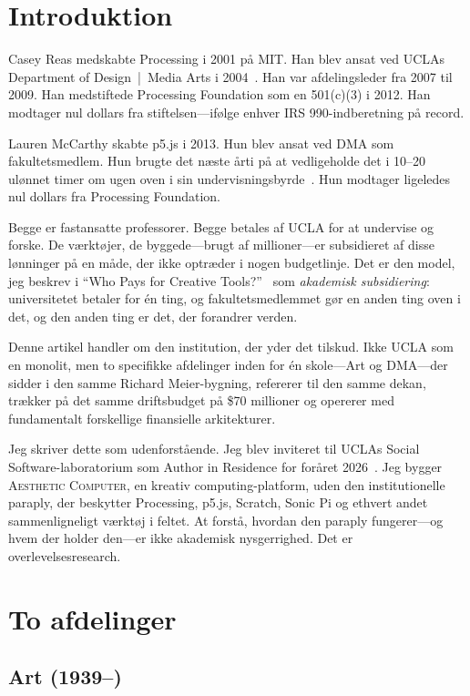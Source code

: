 \documentclass[10pt,letterpaper,twocolumn]{article}
\newcommand{\ac}{\textsc{Aesthetic Computer}}
\newcommand{\dma}{\textsc{DMA}}
\begin{document}
\section{Introduktion}

Casey Reas medskabte Processing i 2001 på MIT. Han blev ansat ved UCLAs Department of Design~|~Media Arts i 2004~\citep{dmahistory}. Han var afdelingsleder fra 2007 til 2009. Han medstiftede Processing Foundation som en 501(c)(3) i 2012. Han modtager nul dollars fra stiftelsen---ifølge enhver IRS 990-indberetning på record.

Lauren McCarthy skabte p5.js i 2013. Hun blev ansat ved \dma{} som fakultetsmedlem. Hun brugte det næste årti på at vedligeholde det i 10--20 ulønnet timer om ugen oven i sin undervisningsbyrde~\citep{mccarthy2023making}. Hun modtager ligeledes nul dollars fra Processing Foundation.

Begge er fastansatte professorer. Begge betales af UCLA for at undervise og forske. De værktøjer, de byggede---brugt af millioner---er subsidieret af disse lønninger på en måde, der ikke optræder i nogen budgetlinje. Det er den model, jeg beskrev i ``Who Pays for Creative Tools?''~\citep{scudder2026sustainability} som \emph{akademisk subsidiering}: universitetet betaler for én ting, og fakultetsmedlemmet gør en anden ting oven i det, og den anden ting er det, der forandrer verden.

Denne artikel handler om den institution, der yder det tilskud. Ikke UCLA som en monolit, men to specifikke afdelinger inden for én skole---Art og \dma{}---der sidder i den samme Richard Meier-bygning, refererer til den samme dekan, trækker på det samme driftsbudget på \$70 millioner og opererer med fundamentalt forskellige finansielle arkitekturer.

Jeg skriver dette som udenforstående. Jeg blev inviteret til UCLAs Social Software-laboratorium som Author in Residence for foråret 2026~\citep{scudder2026ac}. Jeg bygger \ac{}, en kreativ computing-platform, uden den institutionelle paraply, der beskytter Processing, p5.js, Scratch, Sonic Pi og ethvert andet sammenligneligt værktøj i feltet. At forstå, hvordan den paraply fungerer---og hvem der holder den---er ikke akademisk nysgerrighed. Det er overlevelsesresearch.

\section{To afdelinger}

\subsection{Art (1939--)}
\end{document}
